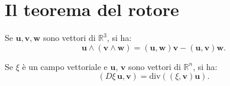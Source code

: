 \documentclass[italian,a4paper]{scrartcl}
\newcommand{\RR}{{\mathbb R}}
\renewcommand{\vec}{\mathbf}
\renewcommand{\div}{\mathrm{div}}
\begin{document}
\begin{comment}
In effetti possiamo definire
\[
 \alpha_{\vec u}(\vec{v_1},\dots,\vec{v_{k-1}}) = \omega_{\Phi(\vec
   u)}(\partial \Phi/\partial \vec{v_1}, \dots, \partial \Phi/\partial\vec{v_{k-1}})
\]
cosicché si ha, per definizione di integrale lungo $\Phi_j^\pm$,
\begin{align*}
  \int_{\Phi_j^\pm} \omega
  &= \int_{[0,1]^{k-1}} \omega_{\Phi_j^\pm(\vec v)} \left(\frac{\partial \Phi_j^\pm}{\partial v_1}, \dots , \frac{\partial \Phi_j^\pm}
  {\partial v_{k-1}}\right)\, dv_1\dots dv_{k-1}  \\
  &= \int_{F_k^\pm}
  \alpha_{\vec
    u}(\vec{e_1},\dots,\vec{e_{j-1}},\vec{e_{j+1}},\vec{e_{k-1}})\,
  du_1 \dots du_{j-1}\, du_{j+1} \dots du_{k-1}
\end{align*}
dove $F_k^+$ è la faccia del cubo $[0,1]^k$ dove $x_j=1$, mentre
$F_k^-$ e la faccia dove $x_j=0$.
\end{proof}
\end{comment} %

\section{Il teorema del rotore}
\begin{lemma}
\label{lm:triple_external_product}
Se $\vec u,\vec v, \vec w$ sono vettori di $\RR^3$, si ha:
\[
\vec u\wedge (\vec v \wedge \vec w)  = (\vec u,\vec w) \vec v - (\vec
u,\vec v) \vec w.
\]
\end{lemma}

\begin{lemma}
\label{lm:div_jacobian}
Se $\xi$ è un campo vettoriale e $\vec u$, $\vec v$ sono vettori di
$\RR^n$, si ha:
\[
(D\xi\, \vec u,\vec v) = \div ((\xi,\vec v)\vec u).
\]
\end{lemma}
\end{document}
